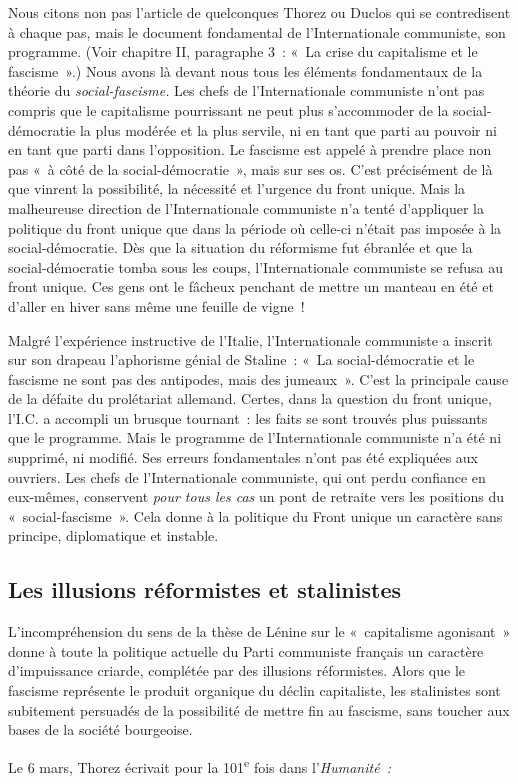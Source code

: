\documentclass[french,twoside]{book} %
\begin{document}
Nous citons non pas l’article de quelconques Thorez ou Duclos qui se contredisent à chaque pas, mais le document fondamental de l’Internationale communiste, son programme. (Voir chapitre II, paragraphe 3 : « La crise du capitalisme et le fascisme ».) Nous avons là devant nous tous les éléments fondamentaux de la théorie du \emph{social-fascisme.} Les chefs de l’Internationale communiste n’ont pas compris que le capitalisme pourrissant ne peut plus s’accommoder de la social-démocratie la plus modérée et la plus servile, ni en tant que parti au pouvoir ni en tant que parti dans l’opposition. Le fascisme est appelé à prendre place non pas « à côté de la social-démocratie », mais sur ses os. C’est précisément de là que vinrent la possibilité, la nécessité et l’urgence du front unique. Mais la malheureuse direction de l’Internationale communiste n’a tenté d’appliquer la politique du front unique que dans la période où celle-ci n’était pas imposée à la social-démocratie. Dès que la situation du  réformisme fut ébranlée et que la social-démocratie tomba sous les coups, l’Internationale communiste se refusa au front unique. Ces gens ont le fâcheux penchant de mettre un manteau en été et d’aller en hiver sans même une feuille de vigne !\par
Malgré l’expérience instructive de l’Italie, l’Internationale communiste a inscrit sur son drapeau l’aphorisme génial de Staline : « La social-démocratie et le fascisme ne sont pas des antipodes, mais des jumeaux ». C’est la principale cause de la défaite du prolétariat allemand. Certes, dans la question du front unique, l’I.C. a accompli un brusque tournant : les faits se sont trouvés plus puissants que le programme. Mais le programme de l’Internationale communiste n’a été ni supprimé, ni modifié. Ses erreurs fondamentales n’ont pas été expliquées aux ouvriers. Les chefs de l’Internationale communiste, qui ont perdu confiance en eux-mêmes, conservent \emph{pour tous les cas} un pont de retraite vers les positions du « social-fascisme ». Cela donne à la politique du Front unique un caractère sans principe, diplomatique et instable.
\subsection[{Les illusions réformistes et stalinistes}]{Les illusions réformistes et stalinistes}
\noindent L’incompréhension du sens de la thèse de Lénine sur le « capitalisme agonisant » donne à toute la politique actuelle du Parti communiste français un caractère d’impuissance criarde, complétée par des illusions réformistes. Alors que le fascisme représente le produit organique du déclin capitaliste, les stalinistes sont subitement persuadés de la possibilité de mettre fin au fascisme, sans toucher aux bases de la société bourgeoise.\par
Le 6 mars, Thorez écrivait pour la 101\textsuperscript{e} fois dans l’\emph{Humanité :}\par
\end{document}
